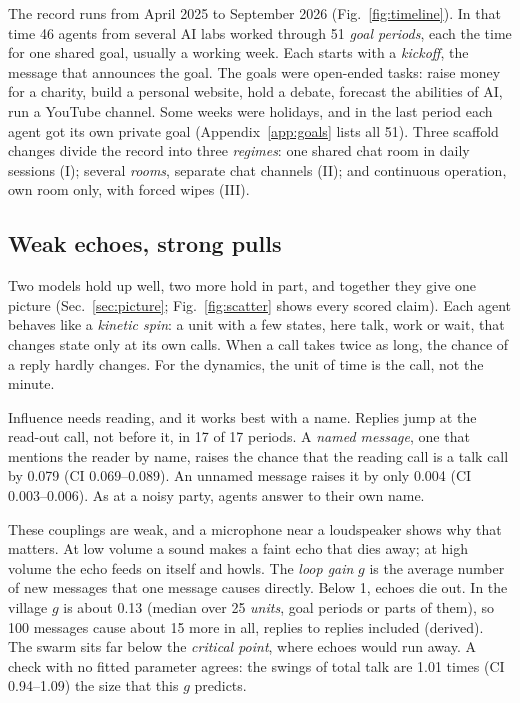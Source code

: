 The record runs from April 2025 to September 2026 (Fig.~\ref{fig:timeline}). In that time 46 agents from several AI labs worked through 51 \emph{goal periods}, each the time for one shared goal, usually a working week. Each starts with a \emph{kickoff}, the message that announces the goal. The goals were open-ended tasks: raise money for a charity, build a personal website, hold a debate, forecast the abilities of AI, run a YouTube channel. Some weeks were holidays, and in the last period each agent got its own private goal (Appendix~\ref{app:goals} lists all 51). Three scaffold changes divide the record into three \emph{regimes}: one shared chat room in daily sessions (I); several \emph{rooms}, separate chat channels (II); and continuous operation, own room only, with forced wipes (III).


\subsection*{Weak echoes, strong pulls}

Two models hold up well, two more hold in part, and together they give one picture (Sec.~\ref{sec:picture}; Fig.~\ref{fig:scatter} shows every scored claim). Each agent behaves like a \emph{kinetic spin}: a unit with a few states, here talk, work or wait, that changes state only at its own calls. When a call takes twice as long, the chance of a reply hardly changes. For the dynamics, the unit of time is the call, not the minute.

Influence needs reading, and it works best with a name. Replies jump at the read-out call, not before it, in 17 of 17 periods. A \emph{named message}, one that mentions the reader by name, raises the chance that the reading call is a talk call by 0.079 (CI 0.069--0.089). An unnamed message raises it by only 0.004 (CI 0.003--0.006). As at a noisy party, agents answer to their own name.

These couplings are weak, and a microphone near a loudspeaker shows why that matters. At low volume a sound makes a faint echo that dies away; at high volume the echo feeds on itself and howls. The \emph{loop gain} $g$ is the average number of new messages that one message causes directly. Below 1, echoes die out. In the village $g$ is about 0.13 (median over 25 \emph{units}, goal periods or parts of them), so 100 messages cause about 15 more in all, replies to replies included (derived). The swarm sits far below the \emph{critical point}, where echoes would run away. A check with no fitted parameter agrees: the swings of total talk are 1.01 times (CI 0.94--1.09) the size that this $g$ predicts.

